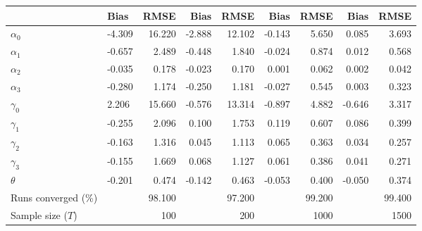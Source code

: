
\begin{tabular}[t]{llrrrrrrr}
\toprule
  & Bias & RMSE & Bias & RMSE & Bias & RMSE & Bias & RMSE\\
\midrule
$\alpha_{0}$ & -4.309 & 16.220 & -2.888 & 12.102 & -0.143 & 5.650 & 0.085 & 3.693\\
$\alpha_{1}$ & -0.657 & 2.489 & -0.448 & 1.840 & -0.024 & 0.874 & 0.012 & 0.568\\
$\alpha_{2}$ & -0.035 & 0.178 & -0.023 & 0.170 & 0.001 & 0.062 & 0.002 & 0.042\\
$\alpha_{3}$ & -0.280 & 1.174 & -0.250 & 1.181 & -0.027 & 0.545 & 0.003 & 0.323\\
$\gamma_{0}$ & 2.206 & 15.660 & -0.576 & 13.314 & -0.897 & 4.882 & -0.646 & 3.317\\
$\gamma_{1}$ & -0.255 & 2.096 & 0.100 & 1.753 & 0.119 & 0.607 & 0.086 & 0.399\\
$\gamma_{2}$ & -0.163 & 1.316 & 0.045 & 1.113 & 0.065 & 0.363 & 0.034 & 0.257\\
$\gamma_{3}$ & -0.155 & 1.669 & 0.068 & 1.127 & 0.061 & 0.386 & 0.041 & 0.271\\
$\theta$ & -0.201 & 0.474 & -0.142 & 0.463 & -0.053 & 0.400 & -0.050 & 0.374\\
Runs converged (\%) &  & 98.100 &  & 97.200 &  & 99.200 &  & 99.400\\
Sample size ($T$) &  & 100 &  & 200 &  & 1000 &  & 1500\\
\bottomrule
\end{tabular}
